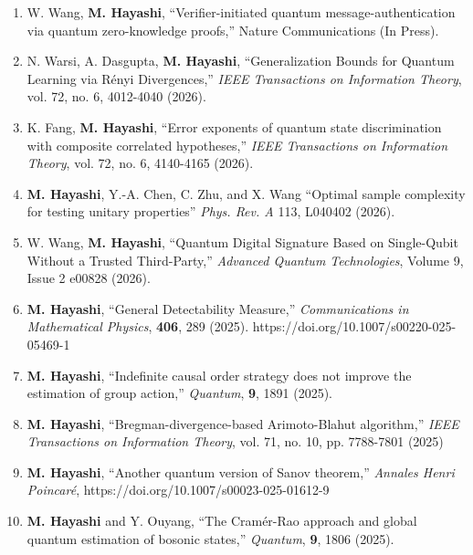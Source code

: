 \documentclass[a4paper,12pt,oneside]{article}
\begin{document}
\begin{enumerate}

\item
W. Wang, \textbf{M. Hayashi},
``Verifier-initiated quantum message-authentication via quantum zero-knowledge proofs,''
Nature Communications (In Press).

\item
N. Warsi, A. Dasgupta, \textbf{M. Hayashi},
``Generalization Bounds for Quantum Learning via R\'{e}nyi Divergences,''
{\em IEEE Transactions on Information Theory}, 
vol. 72, no. 6, 4012-4040 (2026).

\item
K. Fang, \textbf{M. Hayashi},
``Error exponents of quantum state discrimination with composite correlated hypotheses,''
{\em IEEE Transactions on Information Theory}, 
 vol. 72, no. 6, 4140-4165 (2026).

\item
\textbf{M. Hayashi}, Y.-A. Chen, C. Zhu, and X. Wang
``Optimal sample complexity for testing unitary properties''
{\em Phys. Rev. A} 113, L040402 (2026).

\item
W. Wang, \textbf{M. Hayashi},
``Quantum Digital Signature Based on Single-Qubit Without a Trusted Third-Party,''
{\em Advanced Quantum Technologies}, 
Volume 9, Issue 2 e00828
(2026).

\item
\textbf{M. Hayashi},
``General Detectability Measure,''
{\em Communications in Mathematical Physics},
{\bf 406}, 289 (2025). https://doi.org/10.1007/s00220-025-05469-1

\item
\textbf{M. Hayashi},
``Indefinite causal order strategy does not improve the estimation of group action,''
{\em Quantum}, {\bf 9}, 1891 (2025).

\item
\textbf{M. Hayashi},
``Bregman-divergence-based Arimoto-Blahut algorithm,''
{\em IEEE Transactions on Information Theory}, 
vol. 71, no. 10, pp. 7788-7801 (2025)

\item
\textbf{M. Hayashi},
``Another quantum version of Sanov theorem,'' 
{\em Annales Henri Poincaré}, 
https://doi.org/10.1007/s00023-025-01612-9


\item
\textbf{M. Hayashi} and Y. Ouyang,
``The Cramér-Rao approach and global quantum estimation of bosonic states,''
{\em Quantum}, {\bf 9}, 1806 (2025).


\end{enumerate}
\end{document}
